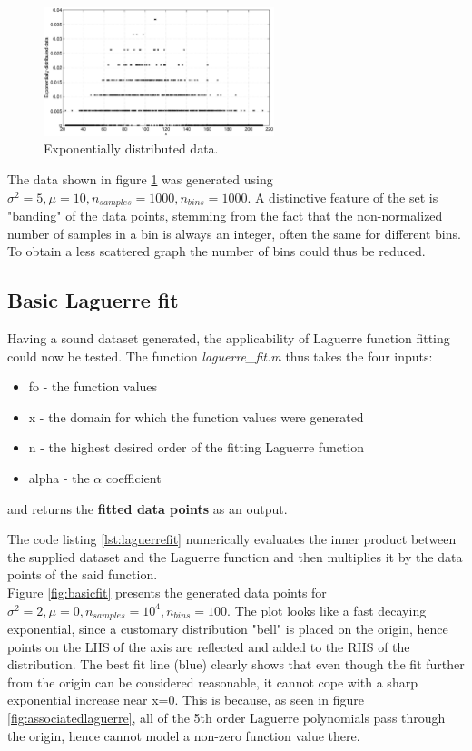 \documentclass[a4paper]{article}
\numberwithin{equation}{section}
\begin{document}
\begin{figure}
\centering
\includegraphics[width=0.6\textwidth]{exp_data.eps}
\caption{\label{fig:expdata}Exponentially distributed data.}
\end{figure}

\noindent The data shown in figure \ref{fig:expdata} was generated using $\sigma^2=5, \mu=10, n_{samples} = 1000, n_{bins} = 1000$. A distinctive feature of the set is "banding" of the data points, stemming from the fact that the non-normalized number of samples in a bin is always an integer, often the same for different bins. To obtain a less scattered graph the number of bins could thus be reduced.

\subsection{Basic Laguerre fit}
Having a sound dataset generated, the applicability of Laguerre function fitting could now be tested. The function \textit{laguerre\_fit.m} thus takes the four inputs:
\begin{itemize}
\item fo - the function values
\item x - the domain for which the function values were generated
\item n - the highest desired order of the fitting Laguerre function
\item alpha - the $\alpha$ coefficient
\end{itemize}
and returns the \textbf{fitted data points} as an output.



\noindent The code listing \ref{lst:laguerrefit} numerically evaluates the inner product between the supplied dataset and the Laguerre function and then multiplies it by the data points of the said function. \\

\noindent Figure \ref{fig:basicfit} presents the generated data points for $\sigma^2=2, \mu=0, n_{samples}=10^4, n_{bins}=100$. The plot looks like a fast decaying exponential, since a customary distribution "bell" is placed on the origin, hence points on the LHS of the axis are reflected and added to the RHS of the distribution. The best fit line (blue) clearly shows that even though the fit further from the origin can be considered reasonable, it cannot cope with a sharp exponential increase near x=0. This is because, as seen in figure \ref{fig:associatedlaguerre}, all of the 5th order Laguerre polynomials pass through the origin, hence cannot model a non-zero function value there.
\end{document}
